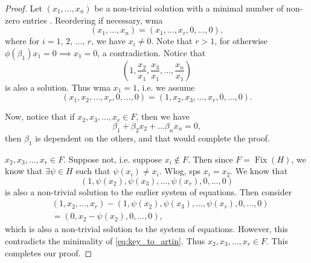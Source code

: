 \documentclass[notoc,notitlepage,nobib]{tufte-book}
\DeclareMathOperator{\Fix}{Fix}
\begin{document}
\begin{proof}
   Let $(x_1, \ldots, x_n)$ be a non-trivial solution with a
  minimal number of non-zero entries . Reordering if necessary, wma
  \begin{equation*}
    (x_1, \ldots, x_n) = (x_1, \ldots, x_r, 0, \ldots, 0),
  \end{equation*}
  where for $i = 1,\,2,\,\ldots,\,r$, we have $x_i \neq 0$. Note that $r > 1$,
  for otherwise $\phi(\beta_1) x_1 = 0 \implies x_1 = 0$, a contradiction.
  Notice that
  \begin{equation*}
    \left( 1, \frac{x_2}{x_1}, \frac{x_3}{x_1}, \ldots, \frac{x_n}{x_1} \right)
  \end{equation*}
  is also a solution. Thus wma $x_1 = 1$, i.e. we assume
  \begin{equation}\label{eq:key_to_artin}
    (x_1, x_2, \ldots, x_r, 0, \ldots, 0) = (1, x_2, x_3, \ldots, x_r, 0, \ldots, 0).
  \end{equation}

  Now, notice that if $x_2, x_3, \ldots, x_r \in F$, then we have
  \begin{equation*}
    \beta_1 + \beta_2 x_2 + \hdots \beta_n x_n = 0,
  \end{equation*}
  then $\beta_1$ is dependent on the others, and that would complete the proof.

  \noindent
   $x_2, x_3, \ldots, x_r \in F$. Suppose not, i.e. suppose
  $x_i \notin F$. Then since $F = \Fix(H)$, we know that $\exists \psi \in H$ 
  such that $\psi(x_i) \neq x_i$. Wlog, sps $x_i = x_2$. We know that
  \begin{equation*}
    (1, \psi(x_2), \psi(x_3), \ldots, \psi(x_r), 0, \ldots, 0)
  \end{equation*}
  is also a non-trivial solution to the earlier system of equations. Then
  consider
  \begin{align*}
    &(1, x_2, \ldots, x_r) - (1, \psi(x_2), \psi(x_3), \ldots, \psi(x_r), 0,
    \ldots, 0) \\
    &= (0, x_2 - \psi(x_2), 0, \ldots, 0),
  \end{align*}
  which is also a non-trivial solution to the system of equations. However, this
  contradicts the minimality of \cref{eq:key_to_artin}. Thus $x_2, x_3, \ldots,
  x_r \in F$. This completes our proof.
\end{proof}
\end{document}
